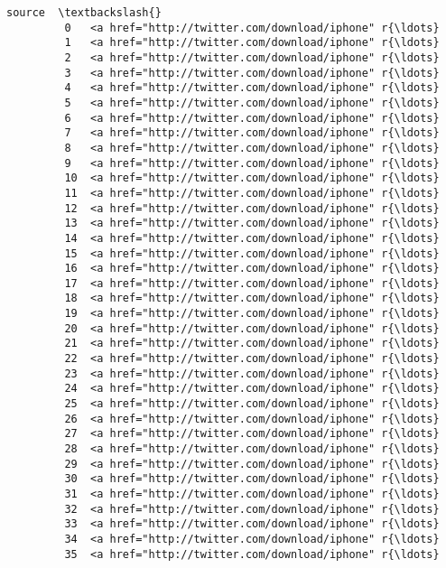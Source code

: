 \documentclass[11pt]{article}
\begin{document}
\begin{Verbatim}[commandchars=\\\{\}]
                                                        source  \textbackslash{}
         0   <a href="http://twitter.com/download/iphone" r{\ldots}   
         1   <a href="http://twitter.com/download/iphone" r{\ldots}   
         2   <a href="http://twitter.com/download/iphone" r{\ldots}   
         3   <a href="http://twitter.com/download/iphone" r{\ldots}   
         4   <a href="http://twitter.com/download/iphone" r{\ldots}   
         5   <a href="http://twitter.com/download/iphone" r{\ldots}   
         6   <a href="http://twitter.com/download/iphone" r{\ldots}   
         7   <a href="http://twitter.com/download/iphone" r{\ldots}   
         8   <a href="http://twitter.com/download/iphone" r{\ldots}   
         9   <a href="http://twitter.com/download/iphone" r{\ldots}   
         10  <a href="http://twitter.com/download/iphone" r{\ldots}   
         11  <a href="http://twitter.com/download/iphone" r{\ldots}   
         12  <a href="http://twitter.com/download/iphone" r{\ldots}   
         13  <a href="http://twitter.com/download/iphone" r{\ldots}   
         14  <a href="http://twitter.com/download/iphone" r{\ldots}   
         15  <a href="http://twitter.com/download/iphone" r{\ldots}   
         16  <a href="http://twitter.com/download/iphone" r{\ldots}   
         17  <a href="http://twitter.com/download/iphone" r{\ldots}   
         18  <a href="http://twitter.com/download/iphone" r{\ldots}   
         19  <a href="http://twitter.com/download/iphone" r{\ldots}   
         20  <a href="http://twitter.com/download/iphone" r{\ldots}   
         21  <a href="http://twitter.com/download/iphone" r{\ldots}   
         22  <a href="http://twitter.com/download/iphone" r{\ldots}   
         23  <a href="http://twitter.com/download/iphone" r{\ldots}   
         24  <a href="http://twitter.com/download/iphone" r{\ldots}   
         25  <a href="http://twitter.com/download/iphone" r{\ldots}   
         26  <a href="http://twitter.com/download/iphone" r{\ldots}   
         27  <a href="http://twitter.com/download/iphone" r{\ldots}   
         28  <a href="http://twitter.com/download/iphone" r{\ldots}   
         29  <a href="http://twitter.com/download/iphone" r{\ldots}   
         30  <a href="http://twitter.com/download/iphone" r{\ldots}   
         31  <a href="http://twitter.com/download/iphone" r{\ldots}   
         32  <a href="http://twitter.com/download/iphone" r{\ldots}   
         33  <a href="http://twitter.com/download/iphone" r{\ldots}   
         34  <a href="http://twitter.com/download/iphone" r{\ldots}   
         35  <a href="http://twitter.com/download/iphone" r{\ldots}   

\end{Verbatim}
\end{document}
